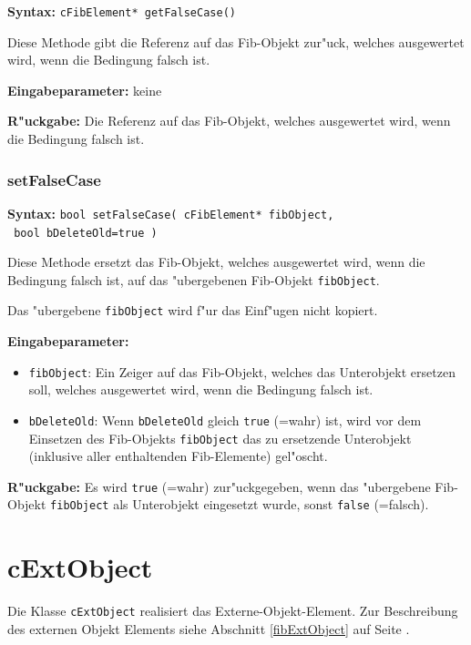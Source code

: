 \textbf{Syntax:} \verb|cFibElement* getFalseCase()|

\bigskip\noindent
Diese Methode gibt die Referenz auf das Fib-Objekt zur"uck, welches ausgewertet wird, wenn die Bedingung falsch ist.

\bigskip\noindent
\textbf{Eingabeparameter:} keine

\bigskip\noindent
\textbf{R"uckgabe:} Die Referenz auf das Fib-Objekt, welches ausgewertet wird, wenn die Bedingung falsch ist.


\subsubsection{setFalseCase}

\textbf{Syntax:} \verb|bool setFalseCase( cFibElement* fibObject,| \\\verb| bool bDeleteOld=true )|

\bigskip\noindent
Diese Methode ersetzt das Fib-Objekt, welches ausgewertet wird, wenn die Bedingung falsch ist, auf das "ubergebenen Fib-Objekt \verb|fibObject|.

Das "ubergebene \verb|fibObject| wird f"ur das Einf"ugen nicht kopiert.

\bigskip\noindent
\textbf{Eingabeparameter:}
\begin{itemize}
 \item \verb|fibObject|: Ein Zeiger auf das Fib-Objekt, welches das Unterobjekt ersetzen soll, welches ausgewertet wird, wenn die Bedingung falsch ist.
 \item \verb|bDeleteOld|: Wenn \verb|bDeleteOld| gleich \verb|true| (=wahr) ist, wird vor dem Einsetzen des Fib-Objekts \verb|fibObject| das zu ersetzende Unterobjekt (inklusive aller enthaltenden Fib-Elemente) gel"oscht.
\end{itemize}

\bigskip\noindent
\textbf{R"uckgabe:} Es wird \verb|true| (=wahr) zur"uckgegeben, wenn das "ubergebene Fib-Objekt \verb|fibObject| als Unterobjekt eingesetzt wurde, sonst \verb|false| (=falsch).



\section{cExtObject}
\label{secCExtObject}\label{secCExtObjectElement}

Die Klasse \verb|cExtObject| realisiert das Externe-Objekt-Element.
Zur Beschreibung des externen Objekt Elements siehe Abschnitt \ref{fibExtObject} auf Seite \pageref{fibExtObject} .

